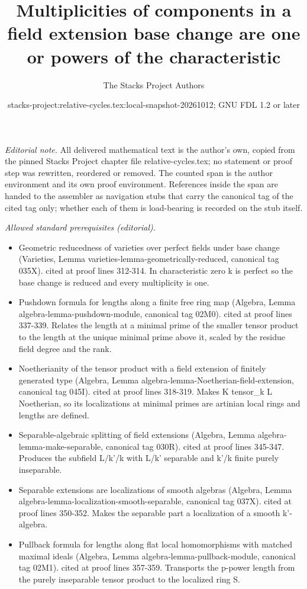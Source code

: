 \documentclass{stacks-project}
\title{Multiplicities of components in a field extension base change are one or powers of the characteristic}
\author{The Stacks Project Authors}
\date{stacks-project:relative-cycles.tex:local-snapshot-20261012; GNU FDL 1.2 or later}
\theoremstyle{plain}
\theoremstyle{definition}
\theoremstyle{remark}
\numberwithin{equation}{subsection}
\begin{document}
\maketitle
\setcounter{subsection}{1}
\noindent\textit{Editorial note.} All delivered mathematical text is the author's own, copied from the pinned Stacks Project chapter file relative-cycles.tex; no statement or proof step was rewritten, reordered or removed. The counted span is the author environment and its own proof environment. References inside the span are handed to the assembler as navigation stubs that carry the canonical tag of the cited tag only; whether each of them is load-bearing is recorded on the stub itself.\par\medskip
\noindent\textit{Allowed standard prerequisites (editorial).}\begin{itemize}
\item Geometric reducedness of varieties over perfect fields under base change (Varieties, Lemma varieties-lemma-geometrically-reduced, canonical tag 035X). cited at proof lines 312-314. In characteristic zero k is perfect so the base change is reduced and every multiplicity is one.
\item Pushdown formula for lengths along a finite free ring map (Algebra, Lemma algebra-lemma-pushdown-module, canonical tag 02M0). cited at proof lines 337-339. Relates the length at a minimal prime of the smaller tensor product to the length at the unique minimal prime above it, scaled by the residue field degree and the rank.
\item Noetherianity of the tensor product with a field extension of finitely generated type (Algebra, Lemma algebra-lemma-Noetherian-field-extension, canonical tag 045I). cited at proof lines 318-319. Makes K tensor\_k L Noetherian, so its localizations at minimal primes are artinian local rings and lengths are defined.
\item Separable-algebraic splitting of field extensions (Algebra, Lemma algebra-lemma-make-separable, canonical tag 030R). cited at proof lines 345-347. Produces the subfield L/k'/k with L/k' separable and k'/k finite purely inseparable.
\item Separable extensions are localizations of smooth algebras (Algebra, Lemma algebra-lemma-localization-smooth-separable, canonical tag 037X). cited at proof lines 350-352. Makes the separable part a localization of a smooth k'-algebra.
\item Pullback formula for lengths along flat local homomorphisms with matched maximal ideals (Algebra, Lemma algebra-lemma-pullback-module, canonical tag 02M1). cited at proof lines 357-359. Transports the p-power length from the purely inseparable tensor product to the localized ring S.
\end{itemize}\medskip
\end{document}
